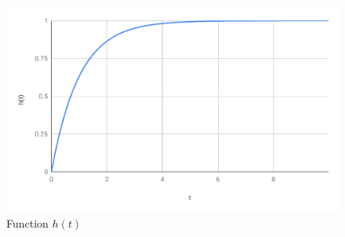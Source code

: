 \begin{figure}[ht]
    \centering
    \includegraphics[scale=0.74]{image/05-RC-RL/h.pdf}
    \caption{Function $h(t)$}
    \label{figure.05.h}
\end{figure}